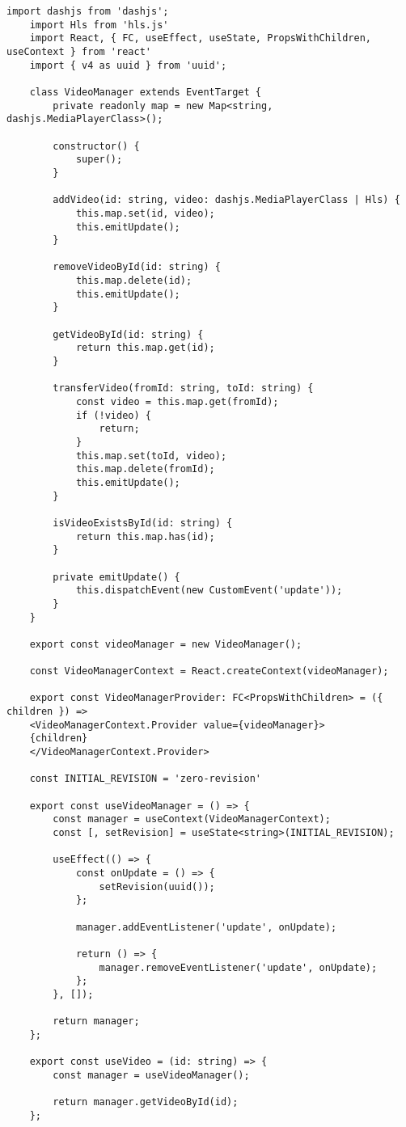 \begin{lstlisting}[caption={video-manager.tsx}]
	import dashjs from 'dashjs';
	import Hls from 'hls.js'
	import React, { FC, useEffect, useState, PropsWithChildren, useContext } from 'react'
	import { v4 as uuid } from 'uuid';
	
	class VideoManager extends EventTarget {
		private readonly map = new Map<string, dashjs.MediaPlayerClass>();
		
		constructor() {
			super();
		}
		
		addVideo(id: string, video: dashjs.MediaPlayerClass | Hls) {
			this.map.set(id, video);
			this.emitUpdate();
		}
		
		removeVideoById(id: string) {
			this.map.delete(id);
			this.emitUpdate();
		}
		
		getVideoById(id: string) {
			return this.map.get(id);
		}
		
		transferVideo(fromId: string, toId: string) {
			const video = this.map.get(fromId);
			if (!video) {
				return;
			}
			this.map.set(toId, video);
			this.map.delete(fromId);
			this.emitUpdate();
		}
		
		isVideoExistsById(id: string) {
			return this.map.has(id);
		}
		
		private emitUpdate() {
			this.dispatchEvent(new CustomEvent('update'));
		}
	}
	
	export const videoManager = new VideoManager();
	
	const VideoManagerContext = React.createContext(videoManager);
	
	export const VideoManagerProvider: FC<PropsWithChildren> = ({ children }) =>
	<VideoManagerContext.Provider value={videoManager}>
	{children}
	</VideoManagerContext.Provider>
	
	const INITIAL_REVISION = 'zero-revision'
	
	export const useVideoManager = () => {
		const manager = useContext(VideoManagerContext);
		const [, setRevision] = useState<string>(INITIAL_REVISION);
		
		useEffect(() => {
			const onUpdate = () => {
				setRevision(uuid());
			};        
			
			manager.addEventListener('update', onUpdate);
			
			return () => {
				manager.removeEventListener('update', onUpdate);
			};
		}, []);
		
		return manager;
	};
	
	export const useVideo = (id: string) => {
		const manager = useVideoManager();
		
		return manager.getVideoById(id);
	};
\end{lstlisting}

